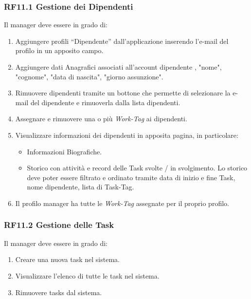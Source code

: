 \documentclass{report}
\begin{document}
\subsubsection*{RF11.1 Gestione dei Dipendenti}
Il manager deve essere in grado di:

\begin{enumerate}
	
	\item Aggiungere profili “Dipendente” dall’applicazione inserendo l’e-mail del profilo in un apposito campo.
	\item Aggiungere dati Anagrafici associati all'account dipendente , "nome", "cognome", "data di nascita", "giorno assunzione".
	\item Rimuovere dipendenti tramite un bottone che permette di selezionare la 
	e-mail del dipendente e rimuoverla dalla lista dipendenti.
	
	\item Assegnare e rimuovere una o più \textit{Work-Tag} ai dipendenti. 
	
	\item Visualizzare informazioni dei dipendenti in apposita pagina, in particolare:
	
	\begin{itemize}
		\item Informazioni Biografiche.
		\item Storico con attività e record delle Task svolte / in svolgimento. Lo storico deve poter essere filtrato e ordinato tramite data di inizio e fine Task, nome dipendente, lista di Task-Tag.
		
	\end{itemize}
	
	\item Il profilo manager ha tutte le \textit{Work-Tag} assegnate per il proprio profilo.
		
\end{enumerate}

\subsubsection{RF11.2 Gestione delle Task}
Il manager deve essere in grado di:

\begin{enumerate}
	\item Creare una nuova task nel sistema.
	\item Visualizzare l'elenco di tutte le task nel sistema.
	\item Rimuovere tasks dal sistema.
\end{enumerate}
\end{document}
